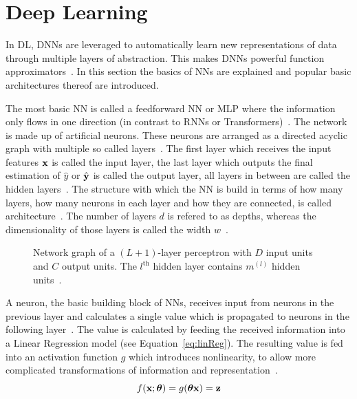 \section{Deep Learning}
In \ac{DL}, \acp{DNN} are leveraged to automatically learn new representations of data through
multiple layers of abstraction.
This makes \acp{DNN} powerful function approximators~\citep{goodfellow_deep_2016}.
In this section the basics of \acp{NN} are explained and popular basic architectures thereof are
introduced.

The most basic \ac{NN} is called a feedforward \ac{NN} or \ac{MLP} where the information only
flows in one direction (in contrast to \acp{RNN} or Transformers)~\citep{goodfellow_deep_2016}.
The network is made up of artificial neurons.
These neurons are arranged as a directed acyclic graph with multiple so
called layers~\citep{goodfellow_deep_2016}.
The first layer which receives the input features $\textbf{x}$ is called the input layer, the last layer
which outputs the final estimation of $\hat{y}$ or $\hat{\textbf{y}}$ is called the output layer, all layers in between
are called the hidden layers~\citep{shrestha_review_2019}.
The structure with which the \ac{NN} is build in terms of how many layers, how many neurons in each
layer and how they are connected, is called architecture~\citep{goodfellow_deep_2016}.
The number of layers $d$ is refered to as depths, whereas the dimensionality of those layers is
called the width $w$~\citep{goodfellow_deep_2016}.
\begin{figure}[ht]
	\centering
    
	\caption[Network graph for a MLP]{%
        Network graph of a $(L+1)$-layer perceptron with $D$ input units and $C$ output units.
        The $l^{\text{th}}$ hidden layer contains $m^{(l)}$ hidden
        units~\citep{chauhan_review_2018,goodfellow_deep_2016}.\label{fig:multilayer-perceptron}
    }
\end{figure}
A neuron, the basic building block of \acp{NN}, receives input from neurons in the previous layer
and calculates a single value which is propagated to neurons in the following
layer~\citep{shrestha_review_2019}.
The value is calculated by feeding the received information into a Linear Regression model (see
Equation~\ref{eq:linReg}).
The resulting value is fed into an activation function $g$ which introduces nonlinearity, to allow
more complicated transformations of information and representation~\citep{goodfellow_deep_2016}.
\begin{equation}\label{eq:neuron}
    f(\textbf{x};\boldsymbol{\theta}) = g(\boldsymbol{\theta}\textbf{x})=\textbf{z}
\end{equation}

